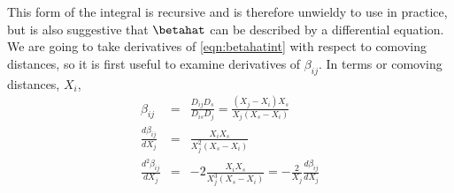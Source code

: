 This form of the integral is recursive and is therefore unwieldy to use in practice, but is also suggestive that $\betahat$ can be described by a differential equation. We are going to take derivatives of \ref{eqn:betahatint} with respect to comoving distances, so it is first useful to examine derivatives of $\beta_{i j}$. In terms or comoving distances, $X_i$, 
\begin{eqnarray}
\label{eqn:d2betahatdbetahat} 
\beta_{i j} &=&\frac{D_{i j} D_s}{D_{i s} D_j} = \frac{(X_j - X_i) X_s}{X_j (X_s - X_i)} \\
\frac{d \beta_{i j}}{d X_j} &=& \frac{X_i X_s}{X_j^2 (X_s - X_i)}\\
\frac{d^2 \beta_{i j}}{d X_j} &=& -2 \frac{X_i X_s}{X_j^3 (X_s - X_i)} = -\frac{2}{X_j} \frac{d \beta_{i j}}{d X_j} 
\end{eqnarray}
  
  
  
  
  
  
  
  